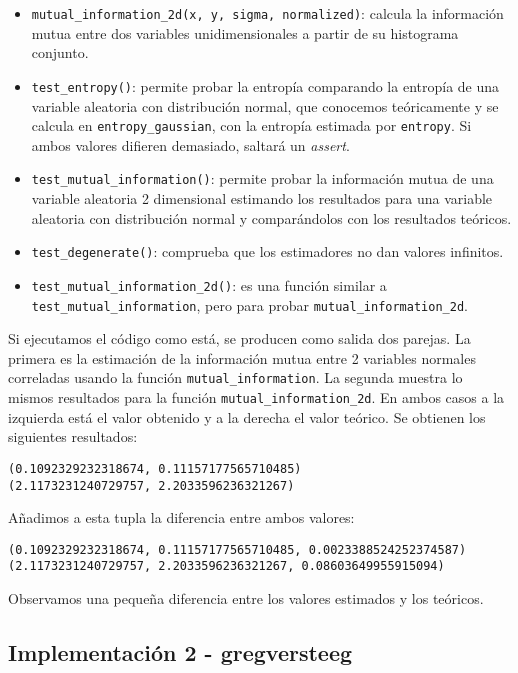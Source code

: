 \documentclass[12pt,a4paper]{report} %
\theoremstyle{definition}
\begin{document}
\begin{itemize}
\item \texttt{mutual\_information\_2d(x, y, sigma, normalized)}: calcula la información mutua entre dos variables unidimensionales a partir de su histograma conjunto. 

\item \texttt{test\_entropy()}: permite probar la entropía comparando la entropía de una variable aleatoria con distribución normal, que conocemos teóricamente y se calcula en \texttt{entropy\_gaussian}, con la entropía estimada por \texttt{entropy}. Si ambos valores difieren demasiado, saltará un \textit{assert}.

\item \texttt{test\_mutual\_information()}: permite probar la información mutua de una variable aleatoria 2 dimensional estimando los resultados para una variable aleatoria con distribución normal y comparándolos con los resultados teóricos.

\item \texttt{test\_degenerate()}: comprueba que los estimadores no dan valores infinitos.

\item \texttt{test\_mutual\_information\_2d()}: es una función similar a \texttt{test\_mutual\_information}, pero para probar \texttt{mutual\_information\_2d}.
\end{itemize} 

Si ejecutamos el código como está, se producen como salida dos parejas. La primera es la estimación de la información mutua entre 2 variables normales correladas usando la función \texttt{mutual\_information}. La segunda muestra lo mismos resultados para la función \texttt{mutual\_information\_2d}. En ambos casos a la izquierda está el valor obtenido y a la derecha el valor teórico. Se obtienen los siguientes resultados:
\begin{lstlisting}
(0.1092329232318674, 0.11157177565710485)
(2.1173231240729757, 2.2033596236321267)
\end{lstlisting}

Añadimos a esta tupla la diferencia entre ambos valores:
\begin{lstlisting}
(0.1092329232318674, 0.11157177565710485, 0.0023388524252374587)
(2.1173231240729757, 2.2033596236321267, 0.08603649955915094)
\end{lstlisting}

Observamos una pequeña diferencia entre los valores estimados y los teóricos.

\subsection{Implementación 2 -  gregversteeg}
\end{document}
